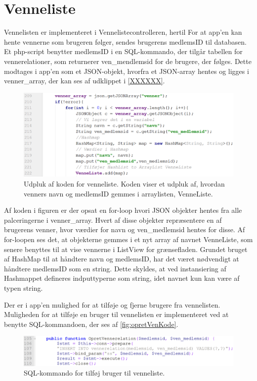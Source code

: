 \section{Venneliste}
Vennelisten er implementeret i Vennelistecontrolleren, hertil 
For at app'en kan hente vennerne som brugeren følger, sendes brugerens medlemsID til databasen. Et php-script benytter medlemsID i en SQL-kommando, der tilgår tabellen for vennerelationer, som returnerer ven_mendlemsid for de brugere, der følges. 
Dette modtages i app'en som et JSON-objekt, hvorfra et JSON-array hentes og ligges i venner_array, der kan ses af udklippet i  \autoref{XXXXXX}.  

\begin{figure} [H]
\centering
\includegraphics[width=1\textwidth]{figures/imple/vennerKode}
\caption{Udpluk af koden for venneliste. Koden viser et udpluk af, hvordan venners navn og medlemsID gemmes i arraylisten, VenneListe.}
\label{fig:vennerKode}
\end{figure} 

Af koden i figuren er der opsat en for-loop hvori JSON objekter hentes fra alle palceringerne i venner_array. Hvert af disse objekter repræsentere en af brugerens venner, hvor værdier for navn og ven_medlemsid hentes for disse. 
Af for-loopen ses det, at objekterne gemmes i et nyt array af navnet VenneListe, som senere benyttes til at vise vennerne i ListView for grænsefladen. Grundet bruget af HashMap til at håndtere navn og medlemsID, har det været nødvendigt at håndtere medlemsID som en string. Dette skyldes, at ved instansiering af Hashmappet defineres indputtyperne som string, idet navnet kun kan være af typen string. 

Der er i app'en mulighed for at tilføje og fjerne brugere fra vennelisten. Muligheden for at tilføje en bruger til vennelisten er implementeret ved at benytte SQL-kommandoen, der ses af \autoref{fig:opretVenKode}.

\begin{figure} [H]
\centering
\includegraphics[width=1\textwidth]{figures/imple/opretVenKode}
\caption{SQL-kommando for tilføj bruger til venneliste.}
\label{fig:opretVenKode}
\end{figure}

